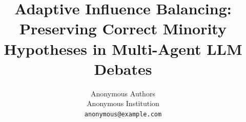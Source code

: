 \documentclass[letterpaper]{article}
\title{Adaptive Influence Balancing:\\
       Preserving Correct Minority Hypotheses in Multi-Agent LLM Debates}
\author{Anonymous Authors\\
        Anonymous Institution\\
        \texttt{anonymous@example.com}}
\begin{document}
\maketitle

\begin{abstract}

\end{abstract}











\end{document}
